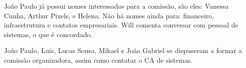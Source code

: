 \documentclass{ata-calico}
\begin{document}
João Paulo já possui nomes interessados para a comissão, são eles: Vanessa Cunha, Arthur Pixels, e Helena. Não há nomes ainda para: financeiro, infraestrutura e contatos empresariais. Will comenta conversar com pessoal de sistemas, o que é concordado.

João Paulo, Luis, Lucas Sousa, Mikael e João Gabriel se dispuseram a formar a comissão organizadora, assim como contatar o CA de sistemas.



\end{document}
